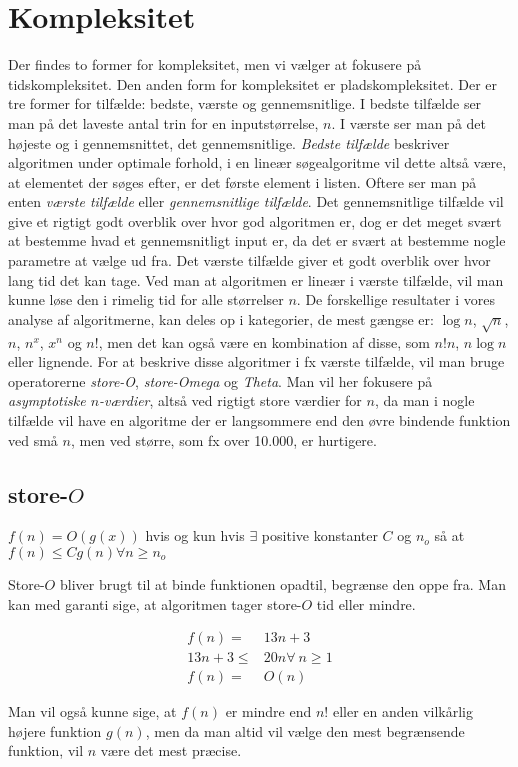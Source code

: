 \section{Kompleksitet}

Der findes to former for kompleksitet, men vi vælger at fokusere på tidskompleksitet. Den anden form for kompleksitet er pladskompleksitet. 
Der er tre former for tilfælde: bedste, værste og gennemsnitlige. 
I bedste tilfælde ser man på det laveste antal trin for en inputstørrelse, $n$. I værste ser man på det højeste og i gennemsnittet, det gennemsnitlige. 
\emph{Bedste tilfælde} beskriver algoritmen under optimale forhold, i en lineær søgealgoritme vil dette altså være, at elementet der søges efter, er det første element i listen. 
Oftere ser man på enten \emph{værste tilfælde} eller \emph{gennemsnitlige tilfælde}. 
Det gennemsnitlige tilfælde vil give et rigtigt godt overblik over hvor god algoritmen er, dog er det meget svært at bestemme hvad et gennemsnitligt input er, da det er svært at bestemme nogle parametre at vælge ud fra. 
Det værste tilfælde giver et godt overblik over hvor lang tid det kan tage. Ved man at algoritmen er lineær i værste tilfælde, vil man kunne løse den i rimelig tid for alle størrelser $n$.
De forskellige resultater i vores analyse af algoritmerne, kan deles op i kategorier, de mest gængse er: $\log n$, $\sqrt{n}$, $n$, $n^x$, $x^n$ og $n!$, men det kan også være en kombination af disse, som $n!n$, $n\log n$ eller lignende.
For at beskrive disse algoritmer i fx værste tilfælde, vil man bruge operatorerne \emph{store-O}, \emph{store-Omega} og \emph{Theta}. Man vil her fokusere på \emph{asymptotiske $n$-værdier}, altså ved rigtigt store værdier for $n$, da man i nogle tilfælde vil have en algoritme der er langsommere end den øvre bindende funktion ved små $n$, men ved større, som fx over 10.000, er hurtigere.

\subsection{store-$O$}
\begin{defn}
$f(n) = O(g(x))$ hvis og kun hvis $\exists$ positive konstanter $C$ og $n_o$ så at $f(n) \leq C g(n) \forall n \geq n_o$
\end{defn}

Store-$O$ bliver brugt til at binde funktionen opadtil, begrænse den oppe fra. Man kan med garanti sige, at algoritmen tager store-$O$ tid eller mindre. 
\begin{exmp}
\begin{align*}
f(n)=& 13n+3 \\
13n+3 \leq& 20n \forall \ n \geq 1 \\
f(n) =& O(n)
\end{align*}
\end{exmp}
Man vil også kunne sige, at $f(n)$ er mindre end $n!$ eller en anden vilkårlig højere funktion $g(n)$, men da man altid vil vælge den mest begrænsende funktion, vil $n$ være det mest præcise. 

